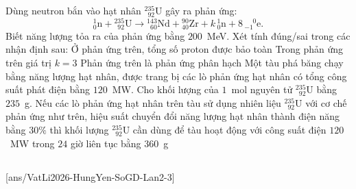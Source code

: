 	\begin{ex}%
		Dùng neutron bắn vào hạt nhân $^{235}_{\phantom{2}92}\text{U}$ gây ra phản ứng:
		\[{}^1_0\text{n}+{}^{235}_{\phantom{2}92}\text{U}\to{}^{143}_{\phantom{1}60}\text{Nd}+{}^{90}_{40}\text{Zr}+k\,{}^1_0\text{n}+8\,{}^{\phantom{-}0}_{-1}\text{e}.\]
		Biết năng lượng tỏa ra của phản ứng bằng $200$~MeV. Xét tính đúng/sai trong các nhận định sau:
		\choiceTFt
		{Ở phản ứng trên, tổng số proton được bảo toàn}
		{\True Trong phản ứng trên giá trị $k=3$}
		{\True Phản ứng trên là phản ứng phân hạch}
		{Một tàu phá băng chạy bằng năng lượng hạt nhân, được trang bị các lò phản ứng hạt nhân có tổng công suất phát điện bằng $120$~MW. Cho khối lượng của $1$~mol nguyên tử $^{235}_{\phantom{2}92}\text{U}$ bằng $235$~g. Nếu các lò phản ứng hạt nhân trên tàu sử dụng nhiên liệu $^{235}_{\phantom{2}92}\text{U}$ với cơ chế phản ứng như trên, hiệu suất chuyển đổi năng lượng hạt nhân thành điện năng bằng $30\%$ thì khối lượng $^{235}_{\phantom{2}92}\text{U}$ cần dùng để tàu hoạt động với công suất điện $120$~MW trong $24$ giờ liên tục bằng $360$~g}
	\end{ex}

	\subsection*{}
	\setcounter{ex}{0}
	[ans/VatLi2026-HungYen-SoGD-Lan2-3]

